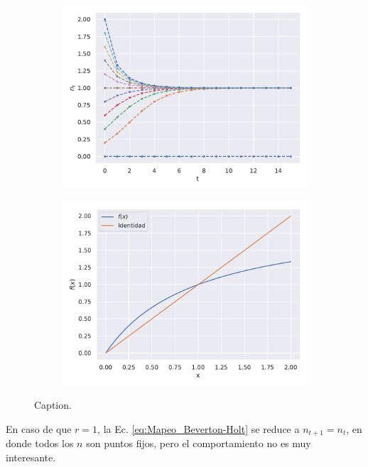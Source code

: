 \begin{figure}
    \centering
    \begin{subfigure}[b]{0.49\textwidth}
        \includegraphics[width=\textwidth, height=0.8\textwidth]{Mapeo_r=2.pdf}
        \caption{}
        \label{01_Simulacion}
    \end{subfigure}
    \hfill
    \begin{subfigure}[b]{0.49\textwidth}
        \includegraphics[width=\textwidth, height=0.8\textwidth]{Coweb_r=2.pdf}
        \caption{}
        \label{01_Coweb}
    \end{subfigure}
    \caption{Caption.}
    \label{PONER_LABEL}
\end{figure}


En caso de que $r=1$, la Ec. \ref{eq:Mapeo_Beverton-Holt} se reduce a $n_{t+1} = n_t$, en donde todos los $n$ son puntos fijos, pero el comportamiento no es muy interesante.